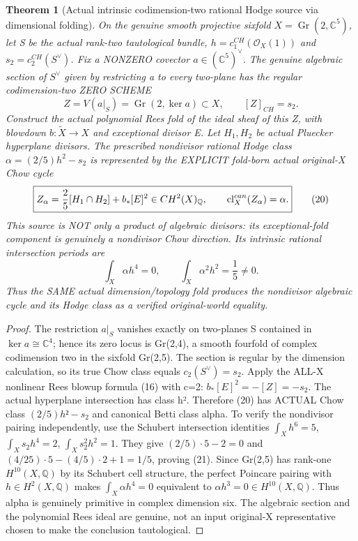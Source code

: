 \documentclass[11pt]{article}
\newtheorem{theorem}{Theorem}[section]
\begin{document}
\begin{theorem}[Actual intrinsic codimension-two rational Hodge source via dimensional folding]
On the genuine smooth projective sixfold
$X=\operatorname{Gr}(2,\mathbb C^5)$, let S be
the actual rank-two tautological bundle,
$h=c_1^{CH}(\mathcal O_X(1))$ and
$s_2=c_2^{CH}(S^\vee)$.
Fix a NONZERO covector
$a\in(\mathbb C^5)^\vee$.
The genuine algebraic section of $S^\vee$
given by restricting a to every two-plane
has the regular codimension-two ZERO SCHEME
\[
 \boxed{
 Z=V(a|_S)=
 \operatorname{Gr}(2,\ker a)\subset X,\qquad
 [Z]_{CH}=s_2.
 }                                                       \tag{19}
\]
Construct the actual polynomial Rees fold
of the ideal sheaf of this Z,
with blowdown $b:\widetilde X\to X$
and exceptional divisor E.
Let $H_1,H_2$ be actual Pluecker hyperplane
divisors. The prescribed nondivisor
rational Hodge class
$\alpha=(2/5)h^2-s_2$
is represented by the EXPLICIT
fold-born actual original-X Chow cycle
\[
 \boxed{
 Z_\alpha={2\over5}[H_1\cap H_2]
                  +b_*[E]^2
 \in CH^2(X)_{\mathbb Q},
 \qquad
 \mathrm{cl}^{can}_X(Z_\alpha)=\alpha .
 }                                                       \tag{20}
\]
This source is NOT only a product of algebraic
divisors: its exceptional-fold component is
genuinely a nondivisor Chow direction.
Its intrinsic rational intersection periods are
\[
 \boxed{
 \int_X\alpha h^4=0,\qquad
 \int_X\alpha^2 h^2=\frac15\ne0.
 }                                                       \tag{21}
\]
Thus the SAME actual dimension/topology fold produces
the nondivisor algebraic cycle and its Hodge class
as a verified original-world equality.
\end{theorem}
\begin{proof}
The restriction $a|_S$ vanishes exactly on
two-planes S contained in $\ker a\cong\mathbb C^4$;
hence its zero locus is Gr(2,4), a smooth
fourfold of complex codimension two in the
sixfold Gr(2,5). The section is regular by
the dimension calculation, so its true Chow
class equals $c_2(S^\vee)=s_2$.
Apply the ALL-X nonlinear Rees blowup formula (16)
with c=2: $b_*[E]^2=-[Z]=-s_2$.
The actual hyperplane intersection has class h².
Therefore (20) has ACTUAL Chow class
$(2/5)h²-s_2$ and canonical Betti class alpha.
To verify the nondivisor pairing independently,
use the Schubert intersection identities
$\int_Xh^6=5$,
$\int_Xs_2h^4=2$,
$\int_Xs_2^2h^2=1$.
They give $(2/5)\cdot5-2=0$ and
$(4/25)\cdot5-(4/5)\cdot2+1=1/5$,
proving (21). Since Gr(2,5) has rank-one
$H^{10}(X,\mathbb Q)$ by its Schubert cell
structure, the perfect Poincare pairing
with $h\in H^2(X,\mathbb Q)$ makes
$\int_X\alpha h^4=0$ equivalent to
$\alpha h^3=0\in H^{10}(X,\mathbb Q)$.
Thus alpha is genuinely primitive in
complex dimension six. The algebraic section and
the polynomial Rees ideal are genuine,
not an input original-X representative
chosen to make the conclusion tautological.
\end{proof}
\end{document}
